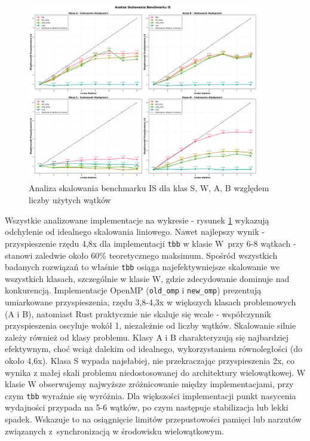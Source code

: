 \begin{figure}[H]
    \centering
    \includegraphics[width=0.9\textwidth]{analiza/images/parallel/is/x86/is_analiza_skalowania.png}
    \caption{Analiza skalowania benchmarku IS dla klas S, W, A, B względem liczby użytych wątków}
    \label{is_analiza_skalowania_x86}
\end{figure}
Wszystkie analizowane implementacje na wykresie - rysunek \ref{is_analiza_skalowania_x86} wykazują odchylenie od idealnego skalowania liniowego. Nawet najlepszy wynik - przyspieszenie rzędu 4,8x dla implementacji \texttt{tbb} w klasie W~przy 6-8 wątkach - stanowi zaledwie około 60\% teoretycznego maksimum. Spośród wszystkich badanych rozwiązań to właśnie \texttt{tbb} osiąga najefektywniejsze skalowanie we wszystkich klasach, szczególnie w klasie W, gdzie zdecydowanie dominuje nad konkurencją. Implementacje OpenMP (\texttt{old\_omp} i \texttt{new\_omp}) prezentują umiarkowane przyspieszenia, rzędu 3,8-4,3x w większych klasach problemowych (A i B), natomiast Rust praktycznie nie skaluje się wcale - współczynnik przyspieszenia oscyluje wokół 1, niezależnie od liczby wątków. Skalowanie silnie zależy również od klasy problemu. Klasy A i B charakteryzują się najbardziej efektywnym, choć wciąż dalekim od idealnego, wykorzystaniem równoległości (do około 4,6x). Klasa S wypada najsłabiej, nie przekraczając przyspieszenia 2x, co wynika z małej skali problemu niedostosowanej do architektury wielowątkowej. W klasie W obserwujemy najwyższe zróżnicowanie między implementacjami, przy czym \texttt{tbb} wyraźnie się wyróżnia. Dla większości implementacji punkt nasycenia wydajności przypada na 5-6 wątków, po czym następuje stabilizacja lub lekki spadek. Wskazuje to na osiągnięcie limitów przepustowości pamięci lub narzutów związanych z~synchronizacją w środowisku wielowątkowym.

